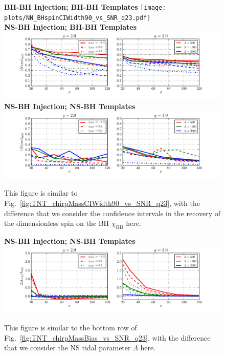 \documentclass[aps,prd,amsmath,floats,floatfix, twocolumn,
superscriptaddress,nofootinbib,showpacs]{revtex4-1}
\begin{document}
\begin{figure}[h]
\centering    
\textbf{BH-BH Injection; BH-BH Templates}
\texttt{[image: plots/NN\_BHspinCIWidth90\_vs\_SNR\_q23.pdf]}\\ 
\textbf{NS-BH Injection; BH-BH Templates}
\includegraphics[width=1.85\columnwidth]{plots/TN_BHspinCIWidth90_vs_SNR_q23.pdf}\\ 
\textbf{NS-BH Injection; NS-BH Templates}
\includegraphics[width=1.85\columnwidth]{plots/TT_BHspinCIWidth90_vs_SNR_q23.pdf}
\caption{This figure is similar to Fig.~\ref{fig:TNT_chirpMassCIWidth90_vs_SNR_q23},
		with the difference that we consider the confidence intervals in the recovery
		of the dimensionless spin on the BH $\chi_\mathrm{BH}$ here.}
	\label{fig:TNT_BHspinCIWidth90_vs_SNR_q23}
\end{figure}
% 
\begin{figure}
\centering
\textbf{NS-BH Injection; NS-BH Templates}
\includegraphics[width=2\columnwidth]{plots/TT_NSLambdaBias_vs_SNR_q23.pdf}
\caption{This figure is similar to the bottom row of
Fig.~\ref{fig:TNT_chirpMassBias_vs_SNR_q23}, with the difference that  we
consider the NS tidal parameter $\Lambda$ here.}
\label{fig:TT_NSLambdaBias_vs_SNR_q23}
\end{figure}
% 
\end{document}
